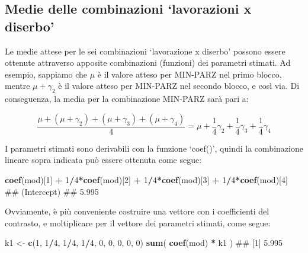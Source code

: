 \documentclass[a4paper,12pt,oneside]{book}
\newenvironment{Shaded}{\begin{snugshade}}{\end{snugshade}}
\newcommand{\KeywordTok}[1]{\textcolor[rgb]{0.13,0.29,0.53}{\textbf{#1}}}
\newcommand{\DecValTok}[1]{\textcolor[rgb]{0.00,0.00,0.81}{#1}}
\newcommand{\StringTok}[1]{\textcolor[rgb]{0.31,0.60,0.02}{#1}}
\newcommand{\OperatorTok}[1]{\textcolor[rgb]{0.81,0.36,0.00}{\textbf{#1}}}
\newcommand{\NormalTok}[1]{#1}
\theoremstyle{definition}
\theoremstyle{definition}
\theoremstyle{definition}
\theoremstyle{remark}
\begin{document}
\subsection{\texorpdfstring{Medie delle combinazioni `lavorazioni x
diserbo'}{Medie delle combinazioni lavorazioni x diserbo}}\label{medie-delle-combinazioni-lavorazioni-x-diserbo}

Le medie attese per le sei combinazioni `lavorazione x diserbo' possono
essere ottenute attraverso apposite combinazioni (funzioni) dei
parametri stimati. Ad esempio, sappiamo che \(\mu\) è il valore atteso
per MIN-PARZ nel primo blocco, mentre \(\mu + \gamma_2\) è il valore
atteso per MIN-PARZ nel secondo blocco, e così via. Di conseguenza, la
media per la combinazione MIN-PARZ sarà pari a:

\[ \frac{\mu + (\mu + \gamma_2) + (\mu + \gamma_3) + (\mu + \gamma_4)}{4} = \mu + \frac{1}{4}\gamma_2 + \frac{1}{4}\gamma_3 + \frac{1}{4}\gamma_4\]

I parametri stimati sono derivabili con la funzione `coef()', quindi la
combinazione lineare sopra indicata può essere ottenuta come segue:

\begin{Shaded}
\begin{Highlighting}[]
\KeywordTok{coef}\NormalTok{(mod)[}\DecValTok{1}\NormalTok{] }\OperatorTok{+}\StringTok{ }\DecValTok{1}\OperatorTok{/}\DecValTok{4}\OperatorTok{*}\KeywordTok{coef}\NormalTok{(mod)[}\DecValTok{2}\NormalTok{] }\OperatorTok{+}\StringTok{ }\DecValTok{1}\OperatorTok{/}\DecValTok{4}\OperatorTok{*}\KeywordTok{coef}\NormalTok{(mod)[}\DecValTok{3}\NormalTok{] }\OperatorTok{+}\StringTok{ }\DecValTok{1}\OperatorTok{/}\DecValTok{4}\OperatorTok{*}\KeywordTok{coef}\NormalTok{(mod)[}\DecValTok{4}\NormalTok{]}
\NormalTok{## (Intercept) }
\NormalTok{##       5.995}
\end{Highlighting}
\end{Shaded}

Ovviamente, è più conveniente costruire una vettore con i coefficienti
del contrasto, e moltiplicare per il vettore dei parametri stimati, come
segue:

\begin{Shaded}
\begin{Highlighting}[]
\NormalTok{k1 <-}\StringTok{ }\KeywordTok{c}\NormalTok{(}\DecValTok{1}\NormalTok{, }\DecValTok{1}\OperatorTok{/}\DecValTok{4}\NormalTok{, }\DecValTok{1}\OperatorTok{/}\DecValTok{4}\NormalTok{, }\DecValTok{1}\OperatorTok{/}\DecValTok{4}\NormalTok{, }\DecValTok{0}\NormalTok{, }\DecValTok{0}\NormalTok{, }\DecValTok{0}\NormalTok{, }\DecValTok{0}\NormalTok{, }\DecValTok{0}\NormalTok{)}
\KeywordTok{sum}\NormalTok{( }\KeywordTok{coef}\NormalTok{(mod) }\OperatorTok{*}\StringTok{ }\NormalTok{k1 )}
\NormalTok{## [1] 5.995}
\end{Highlighting}
\end{Shaded}
\end{document}
